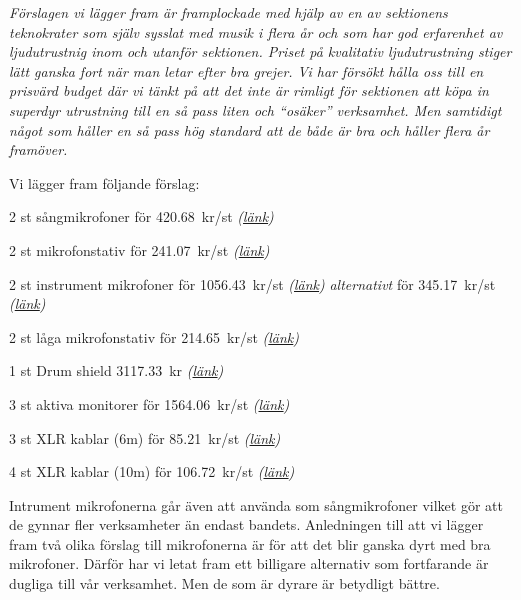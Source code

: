 \documentclass[../_main/handlingar.tex]{subfiles}
\begin{document}
\textit{Förslagen vi lägger fram är framplockade med hjälp av en av sektionens teknokrater som själv sysslat med musik i flera år och som har god erfarenhet av ljudutrustnig inom och utanför sektionen. Priset på kvalitativ ljudutrustning stiger lätt ganska fort när man letar efter bra grejer. Vi har försökt hålla oss till en prisvärd budget där vi tänkt på att det inte är rimligt för sektionen att köpa in superdyr utrustning till en så pass liten och ``osäker'' verksamhet. Men samtidigt något som håller en så pass hög standard att de både är bra och håller flera år framöver.}

Vi lägger fram följande förslag:
\begin{dashlist}
    \item 2 st sångmikrofoner för \SI{420,68}{kr/st} \textit{(\href{https://www.thomann.de/se/the_tbone_mb85_beta.htm}{länk})}
    \item 2 st mikrofonstativ för \SI{241,07}{kr/st} \textit{(\href{https://www.thomann.de/se/km_27115.htm}{länk})}
    \item 2 st instrument mikrofoner för \SI{1056,43}{kr/st} \textit{(\href{https://www.thomann.de/se/shure_sm57_lc.htm}{länk})} \textit{alternativt} för \SI{345,17}{kr/st} \textit{(\href{https://www.thomann.de/se/the_tbone_mb75.htm}{länk})}
    \item 2 st låga mikrofonstativ för \SI{214,65}{kr/st} \textit{(\href{https://www.thomann.de/se/millenium_ms2006.htm}{länk})}
    \item 1 st Drum shield \SI{3117,33}{kr} \textit{(\href{https://www.thomann.de/se/the_t.akustik_ds4_4_drum_shield.htm}{länk})}
    \item 3 st aktiva monitorer för \SI{1564,06}{kr/st} \textit{(\href{https://www.thomann.de/se/behringer_f1220_eurolive.htm}{länk})}
    \item 3 st XLR kablar (6m) för \SI{85,21}{kr/st} \textit{(\href{https://www.thomann.de/se/pro_snake_tpm_6.htm}{länk})}
    \item 4 st XLR kablar (10m) för \SI{106,72}{kr/st} \textit{(\href{https://www.thomann.de/se/pro_snake_tpm_10.htm}{länk})}
\end{dashlist}

\newpage

Intrument mikrofonerna går även att använda som sångmikrofoner vilket gör att de gynnar fler verksamheter än endast bandets. Anledningen till att vi lägger fram två olika förslag till mikrofonerna är för att det blir ganska dyrt med bra mikrofoner. Därför har vi letat fram ett billigare alternativ som fortfarande är dugliga till vår verksamhet. Men de som är dyrare är betydligt bättre.
\end{document}
